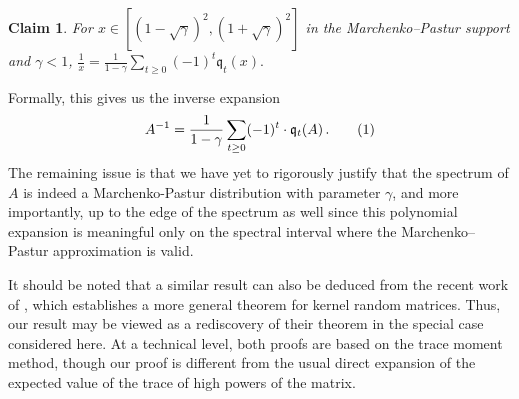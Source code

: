 \documentclass[12pt]{article}
\newtheorem{claim}[theorem]{Claim}
\newcommand\numberthis{\addtocounter{equation}{1}\tag{\theequation}}
\newcommand{\q}{\mathfrak q}
\begin{document}
\begin{claim}\label{clm:inverse-expansion}
For \(x \in [(1-\sqrt{\gamma})^2, (1+\sqrt{\gamma})^2] \) in the Marchenko--Pastur support and \(\gamma<1\),
\(
    \frac{1}{x}
    =
    \frac{1}{1-\gamma}
    \sum_{t\geq 0} (-1)^t \q_t(x).
\)
\end{claim}
%

Formally, this gives us the inverse expansion
\[
    A^{-1}
    =
    \frac{1}{1-\gamma}
    \sum_{t\geq 0} (-1)^t \cdot  \q_t(A) \,. \numberthis \label{eq:poly-expansion-A}
\]
The remaining issue is that we have yet to rigorously justify that the spectrum of $A$ is indeed a Marchenko-Pastur distribution with parameter $\gamma$, and more importantly, up to the edge of the spectrum as well  
since
 this polynomial expansion is meaningful only on the
spectral interval where the Marchenko--Pastur approximation is valid. 

It should be noted that a similar result can also be deduced from the recent work of \cite{kogan2025extremal}, which establishes a more general theorem for kernel random matrices. Thus, our result may be viewed as a rediscovery of their theorem in the special case considered here. At a technical level, both proofs are based on the trace moment method, %
though our proof is different from the usual direct expansion of the expected value of the trace of high powers of the matrix.%
\end{document}
